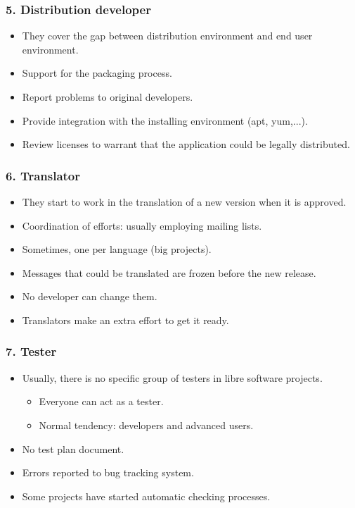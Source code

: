 \documentclass{beamer}
\begin{document}

\begin{frame}
 \frametitle{5. Distribution developer}
 \begin{itemize}
  \item They cover the gap between distribution environment and end user environment.
  \item Support for the packaging process.
  \item Report problems to original developers.
  \item Provide integration with the installing environment (apt, yum,...).
  \item Review licenses to warrant that the application could be legally distributed.
 \end{itemize}

\end{frame}


\begin{frame}
 \frametitle{6. Translator}
 \begin{itemize}
  \item They start to work in the translation of a new version when it is approved.
  \item Coordination of efforts: usually employing mailing lists.
  \item Sometimes, one per language (big projects).
  \item Messages that could be translated are frozen before the new release.
  \item No developer can change them.
  \item Translators make an extra effort to get it ready.
 \end{itemize}

\end{frame}


\begin{frame}
 \frametitle{7. Tester}
 \begin{itemize}
  \item Usually, there is no specific group of testers in libre software projects.
  \begin{itemize}
   \item Everyone can act as a tester.
   \item Normal tendency: developers and advanced users.
  \end{itemize}
  \item No test plan document.
  \item Errors reported to bug tracking system.
  \item Some projects have started automatic checking processes.
 \end{itemize}

\end{frame}
\end{document}

